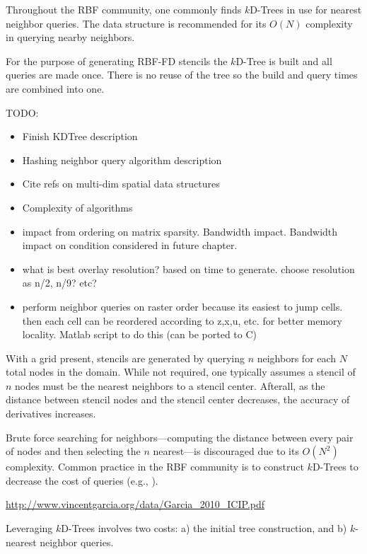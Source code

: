 \documentclass{report}
\begin{document}
Throughout the RBF community, one commonly finds $k$D-Trees in use for nearest neighbor queries. The data structure is recommended for its $O(N)$ complexity in querying nearby neighbors. 



For the purpose of generating RBF-FD stencils the $k$D-Tree is built and all queries are made once. There is no reuse of the tree so the build and query times are combined into one. 

TODO:
\begin{itemize}
\item Finish KDTree description
\item Hashing neighbor query algorithm description
\item Cite refs on multi-dim spatial data structures
\item Complexity of algorithms
\item impact from ordering on matrix sparsity. Bandwidth impact. Bandwidth impact on condition considered in future chapter. 
\item what is best overlay resolution? based on time to generate. choose resolution as n/2, n/9? etc? 
\item perform neighbor queries on raster order because its easiest to jump cells. then each cell can be reordered according to z,x,u, etc. for better memory locality. Matlab script to do this (can be ported to C)
\end{itemize}

With a grid present, stencils are generated by querying $n$ neighbors for each $N$ total nodes in the domain. While not required, one typically assumes a stencil of $n$ nodes must be the nearest neighbors to a stencil center. Afterall, as the distance between stencil nodes and the stencil center decreases, the accuracy of derivatives increases. 

Brute force searching for neighbors---computing the distance between every pair of nodes and then selecting the $n$ nearest---is discouraged due to its $O(N^2)$ complexity. Common practice in the RBF community is to construct $k$D-Trees to decrease the cost of queries (e.g., \cite{Fasshauer2007, FlyerLehto11, FornbergLehto11}). 

\url{http://www.vincentgarcia.org/data/Garcia_2010_ICIP.pdf}

Leveraging $k$D-Trees involves two costs: a) the initial tree construction, and b) $k$-nearest neighbor queries. 
\end{document}
